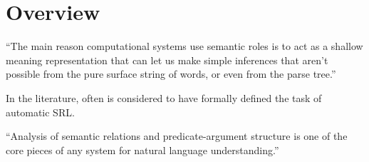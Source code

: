 
\label{chap:2_semantic_roles}

\section{Overview}

``The main reason computational systems use semantic roles is to act as a shallow meaning representation that can let us make simple inferences that aren’t possible from the pure surface string of words, or even from the parse tree.'' \cite[p.~375]{jurafsky2019speech}

In the literature, often \cite{gildea2002automatic} is considered to have formally defined the task of automatic SRL.


``Analysis of semantic relations and predicate-argument structure is one of the core pieces of any system for natural language understanding.'' \citep{palmer2010semantic}

